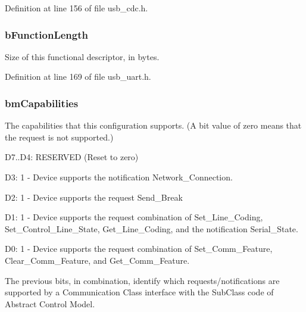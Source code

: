 Definition at line 156 of file usb\-\_\-cdc.\-h.

\hypertarget{struct_u_s_b___abstract___control___management___functional___descriptor_a2d45c545dca79b1a912a7fa0e8d3a691}{
\subsubsection[{b\-Function\-Length}]{ b\-Function\-Length}}\label{struct_u_s_b___abstract___control___management___functional___descriptor_a2d45c545dca79b1a912a7fa0e8d3a691}
Size of this functional descriptor, in bytes. 

Definition at line 169 of file usb\-\_\-uart.\-h.

\hypertarget{struct_u_s_b___abstract___control___management___functional___descriptor_a9ad7ca27543639baeed1b53c6f24e149}{
\subsubsection[{bm\-Capabilities}]{ bm\-Capabilities}}\label{struct_u_s_b___abstract___control___management___functional___descriptor_a9ad7ca27543639baeed1b53c6f24e149}
The capabilities that this configuration supports. (A bit value of zero means that the request is not supported.)
\begin{DoxyItemize}
\item D7..D4\-: R\-E\-S\-E\-R\-V\-E\-D (Reset to zero)
\item D3\-: 1 -\/ Device supports the notification Network\-\_\-\-Connection.
\item D2\-: 1 -\/ Device supports the request Send\-\_\-\-Break
\item D1\-: 1 -\/ Device supports the request combination of Set\-\_\-\-Line\-\_\-\-Coding, Set\-\_\-\-Control\-\_\-\-Line\-\_\-\-State, Get\-\_\-\-Line\-\_\-\-Coding, and the notification Serial\-\_\-\-State.
\item D0\-: 1 -\/ Device supports the request combination of Set\-\_\-\-Comm\-\_\-\-Feature, Clear\-\_\-\-Comm\-\_\-\-Feature, and Get\-\_\-\-Comm\-\_\-\-Feature.
\end{DoxyItemize}The previous bits, in combination, identify which requests/notifications are supported by a Communication Class interface with the Sub\-Class code of Abstract Control Model. 

